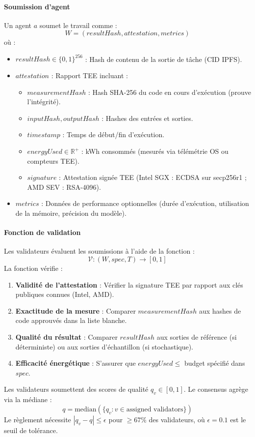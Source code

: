 \documentclass[11pt]{article}
\begin{document}
\paragraph{Soumission d'agent} Un agent $a$ soumet le travail comme :
\begin{equation}
W = (resultHash, attestation, metrics)
\end{equation}
où :
\begin{itemize}[noitemsep]
  \item $resultHash \in \{0,1\}^{256}$ : Hash de contenu de la sortie de tâche (CID IPFS).
  \item $attestation$ : Rapport TEE incluant :
    \begin{itemize}[noitemsep]
      \item $measurementHash$ : Hash SHA-256 du code en cours d'exécution (prouve l'intégrité).
      \item $inputHash, outputHash$ : Hashes des entrées et sorties.
      \item $timestamp$ : Temps de début/fin d'exécution.
      \item $energyUsed \in \mathbb{R}^+$ : kWh consommés (mesurés via télémétrie OS ou compteurs TEE).
      \item $signature$ : Attestation signée TEE (Intel SGX : ECDSA sur secp256r1 ; AMD SEV : RSA-4096).
    \end{itemize}
  \item $metrics$ : Données de performance optionnelles (durée d'exécution, utilisation de la mémoire, précision du modèle).
\end{itemize}

\paragraph{Fonction de validation} Les validateurs évaluent les soumissions à l'aide de la fonction :
\begin{equation}
\mathcal{V}: (W, spec, T) \rightarrow [0, 1]
\end{equation}
La fonction vérifie :
\begin{enumerate}[noitemsep]
  \item \textbf{Validité de l'attestation} : Vérifier la signature TEE par rapport aux clés publiques connues (Intel, AMD).
  \item \textbf{Exactitude de la mesure} : Comparer $measurementHash$ aux hashes de code approuvés dans la liste blanche.
  \item \textbf{Qualité du résultat} : Comparer $resultHash$ aux sorties de référence (si déterministe) ou aux sorties d'échantillon (si stochastique).
  \item \textbf{Efficacité énergétique} : S'assurer que $energyUsed \leq$ budget spécifié dans $spec$.
\end{enumerate}
Les validateurs soumettent des scores de qualité $q_v \in [0,1]$. Le consensus agrège via la médiane :
\begin{equation}
q = \text{median}(\{q_v : v \in \text{assigned validators}\})
\end{equation}
Le règlement nécessite $|q_v - q| \leq \epsilon$ pour $\geq 67\%$ des validateurs, où $\epsilon = 0.1$ est le seuil de tolérance.
\end{document}
